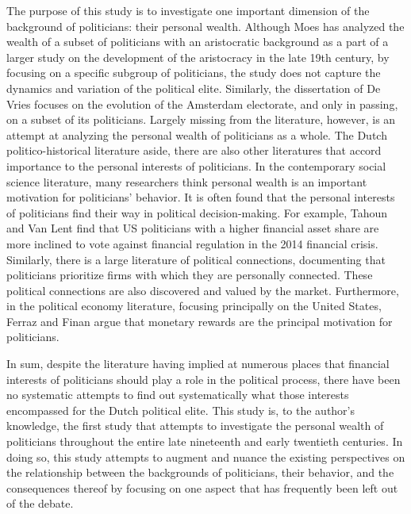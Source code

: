     The purpose of this study is to investigate one important dimension of the background of politicians: their personal wealth. Although Moes has analyzed the wealth of a subset of politicians with an aristocratic background as a part of a larger study on the development of the aristocracy in the late 19th century, by focusing on a specific subgroup of politicians, the study does not capture the dynamics and variation of the political elite. Similarly, the dissertation of De Vries focuses on the evolution of the Amsterdam electorate, and only in passing, on a subset of its politicians.\autocite{de1986electoraat} Largely missing from the literature, however, is an attempt at analyzing the personal wealth of politicians as a whole. The Dutch politico-historical literature aside, there are also other literatures that accord importance to the personal interests of politicians. In the contemporary social science literature, many researchers think personal wealth is an important motivation for politicians' behavior. %
    It is often found that the personal interests of politicians find their way in political decision-making. For example, Tahoun and Van Lent find that US politicians with a higher financial asset share are more inclined to vote against financial regulation in the 2014 financial crisis.\autocite{tahoun2019personal} Similarly, there is a large literature of political connections, documenting that politicians prioritize firms with which they are personally connected\autocite[see e.g.][]{duchin2012politics}. These political connections are also discovered and valued by the market.\autocite{fisman2001estimating} Furthermore, in the political economy literature, focusing principally on the United States, Ferraz and Finan argue that monetary rewards are the principal motivation for politicians.\autocite{ferraz2009motivating}
    
    In sum, despite the literature having implied at numerous places that financial interests of politicians should play a role in the political process, there have been no systematic attempts to find out systematically what those interests encompassed for the Dutch political elite. This study is, to the author's knowledge, the first study that attempts to investigate the personal wealth of politicians throughout the entire late nineteenth and early twentieth centuries. In doing so, this study attempts to augment and nuance the existing perspectives on the relationship between the backgrounds of politicians, their behavior, and the consequences thereof by focusing on one aspect that has frequently been left out of the debate. 

